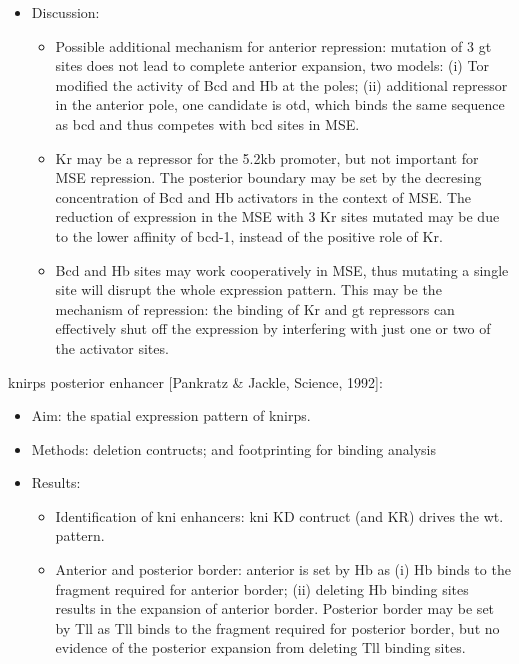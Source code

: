 \documentclass{report}
\begin{document}
\begin{enumerate}
\begin{itemize}
		\item Discussion:
		\begin{itemize}
			\item Possible additional mechanism for anterior repression: mutation of 3 gt sites does not lead to complete anterior expansion, two models: (i) Tor modified the activity of Bcd and Hb at the poles; (ii) additional repressor in the anterior pole, one candidate is otd, which binds the same sequence as bcd and thus competes with bcd sites in MSE.  
			\item Kr may be a repressor for the 5.2kb promoter, but not important for MSE repression. The posterior boundary may be set by the decresing concentration of Bcd and Hb activators in the context of MSE. The reduction of expression in the MSE with 3 Kr sites mutated may be due to the lower affinity of bcd-1, instead of the positive role of Kr. 
			\item Bcd and Hb sites may work cooperatively in MSE, thus mutating a single site will disrupt the whole expression pattern. This may be the mechanism of repression: the binding of Kr and gt repressors can effectively shut off the expression by interfering with just one or two of the activator sites.  
		\end{itemize}
	\end{itemize}
	
	knirps posterior enhancer [Pankratz \& Jackle, Science, 1992]:
	\begin{itemize}
		\item Aim: the spatial expression pattern of knirps. 
		
		\item Methods: deletion contructs; and footprinting for binding analysis
		
		\item Results:
		\begin{itemize}
			\item Identification of kni enhancers: kni KD contruct (and KR) drives the wt. pattern.
			\item Anterior and posterior border: anterior is set by Hb as (i) Hb binds to the fragment required for anterior border; (ii) deleting Hb binding sites results in the expansion of anterior border. Posterior border may be set by Tll as Tll binds to the fragment required for posterior border, but no evidence of the posterior expansion from deleting Tll binding sites. 
		\end{itemize}
	\end{itemize}
	

\end{enumerate}
\end{document}
